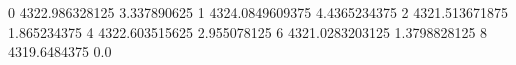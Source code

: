 0 4322.986328125 3.337890625
1 4324.0849609375 4.4365234375
2 4321.513671875 1.865234375
4 4322.603515625 2.955078125
6 4321.0283203125 1.3798828125
8 4319.6484375 0.0
